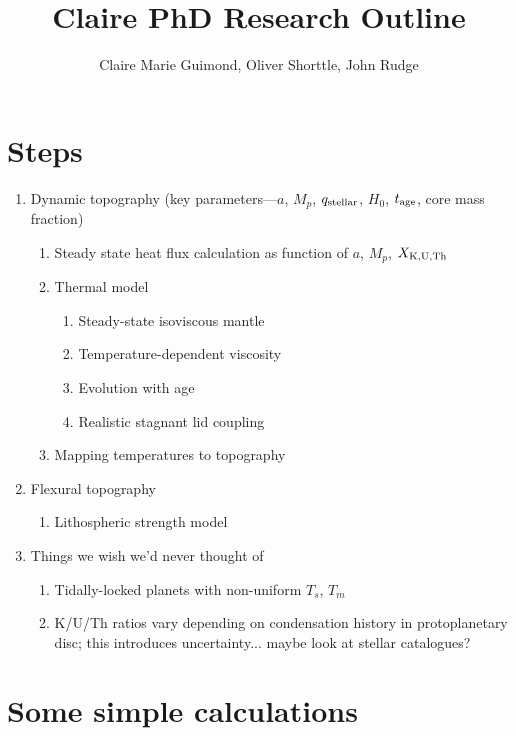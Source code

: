 \documentclass[10pt,a4paper]{article}
\author{Claire Marie Guimond, Oliver Shorttle, John Rudge}
\title{Claire PhD Research Outline}
\begin{document}
\maketitle

\section{Steps}
\begin{enumerate}
\item Dynamic topography (key parameters---$a$, $M_p$, $q_{\rm stellar}$, $H_0$, $t_{\rm age}$, core mass fraction) 
	\begin{enumerate}
	\item Steady state heat flux calculation as function of $a$, $M_p$, $X_{\rm K, U, Th}$
	\item Thermal model
	
		\begin{enumerate}
		
		\item Steady-state isoviscous mantle
		\item Temperature-dependent viscosity
		\item Evolution with age
		\item Realistic stagnant lid coupling
		\end{enumerate}
	\item Mapping temperatures to topography
	\end{enumerate}
		
\item Flexural topography
	\begin{enumerate}
	\item Lithospheric strength model
	\end{enumerate}
	
\item Things we wish we'd never thought of
	\begin{enumerate}
	\item Tidally-locked planets with non-uniform $T_s$, $T_m$
	\item K/U/Th ratios vary depending on condensation history in protoplanetary disc; this introduces uncertainty... maybe look at stellar catalogues?
	\end{enumerate}
	
\end{enumerate}
	
\section{Some simple calculations}
\end{document}
